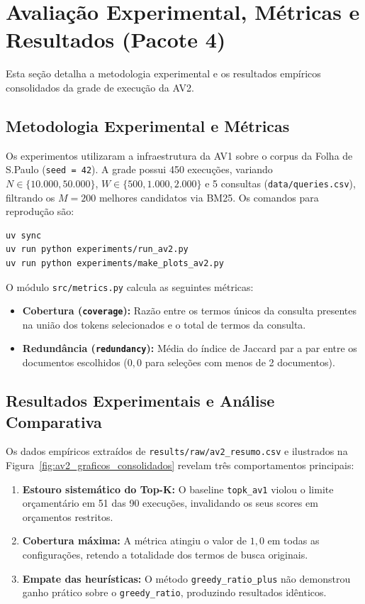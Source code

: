 \section{Avaliação Experimental, Métricas e Resultados (Pacote 4)}
\label{sec:pacote4}

Esta seção detalha a metodologia experimental e os resultados empíricos consolidados da grade de execução da AV2.

\subsection{Metodologia Experimental e Métricas}
Os experimentos utilizaram a infraestrutura da AV1 sobre o corpus da Folha de S.Paulo (\texttt{seed = 42}). A grade possui 450 execuções, variando $N \in \{10.000, 50.000\}$, $W \in \{500, 1.000, 2.000\}$ e 5 consultas (\texttt{data/queries.csv}), filtrando os $M = 200$ melhores candidatos via BM25. Os comandos para reprodução são:
\begin{verbatim}
uv sync
uv run python experiments/run_av2.py
uv run python experiments/make_plots_av2.py
\end{verbatim}

O módulo \texttt{src/metrics.py} calcula as seguintes métricas:
\begin{itemize}
    \item \textbf{Cobertura (\texttt{coverage}):} Razão entre os termos únicos da consulta presentes na união dos tokens selecionados e o total de termos da consulta.
    \item \textbf{Redundância (\texttt{redundancy}):} Média do índice de Jaccard par a par entre os documentos escolhidos ($0{,}0$ para seleções com menos de 2 documentos).
\end{itemize}

\subsection{Resultados Experimentais e Análise Comparativa}
Os dados empíricos extraídos de \texttt{results/raw/av2\_resumo.csv} e ilustrados na Figura~\ref{fig:av2_graficos_consolidados} revelam três comportamentos principais:
\begin{enumerate}
    \item \textbf{Estouro sistemático do Top-K:} O baseline \texttt{topk\_av1} violou o limite orçamentário em 51 das 90 execuções, invalidando os seus scores em orçamentos restritos.
    \item \textbf{Cobertura máxima:} A métrica atingiu o valor de $1{,}0$ em todas as configurações, retendo a totalidade dos termos de busca originais.
    \item \textbf{Empate das heurísticas:} O método \texttt{greedy\_ratio\_plus} não demonstrou ganho prático sobre o \texttt{greedy\_ratio}, produzindo resultados idênticos.
\end{enumerate}

